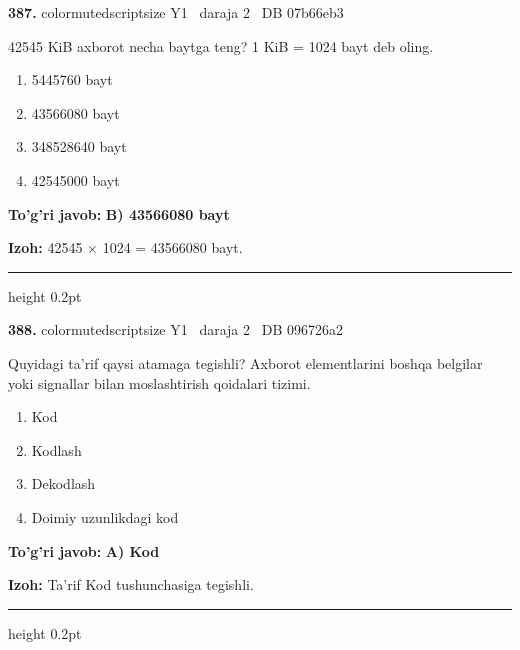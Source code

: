 \documentclass[10pt,a4paper,oneside]{article}
\begin{document}
\noindent\textbf{\color{ink}387.}  {color{muted}scriptsize Y1 \textbullet\ daraja 2 \textbullet\ DB 07b66eb3}
\par
42545 KiB axborot necha baytga teng? 1 KiB = 1024 bayt deb oling.
\begin{enumerate}[label=\Alph*),leftmargin=9mm]
\item 5445760 bayt
\item 43566080 bayt
\item 348528640 bayt
\item 42545000 bayt
\end{enumerate}
\begin{tcolorbox}[enhanced,breakable,colback=teal!4,colframe=teal!50!black,boxrule=0.5pt,arc=1.1mm,left=3mm,right=3mm,top=1.7mm,bottom=1.7mm,before skip=2mm,after skip=2mm]
\textbf{\color{teal}To'g'ri javob:} \textbf{B) 43566080 bayt}
\par\smallskip
\textbf{Izoh:} 42545 \ensuremath{\times} 1024 = 43566080 bayt.
\end{tcolorbox}
\vspace{2mm}\hrule height 0.2pt \vspace{3mm}

\noindent\textbf{\color{ink}388.}  {color{muted}scriptsize Y1 \textbullet\ daraja 2 \textbullet\ DB 096726a2}
\par
Quyidagi ta'rif qaysi atamaga tegishli? Axborot elementlarini boshqa belgilar yoki signallar bilan moslashtirish qoidalari tizimi.
\begin{enumerate}[label=\Alph*),leftmargin=9mm]
\item Kod
\item Kodlash
\item Dekodlash
\item Doimiy uzunlikdagi kod
\end{enumerate}
\begin{tcolorbox}[enhanced,breakable,colback=teal!4,colframe=teal!50!black,boxrule=0.5pt,arc=1.1mm,left=3mm,right=3mm,top=1.7mm,bottom=1.7mm,before skip=2mm,after skip=2mm]
\textbf{\color{teal}To'g'ri javob:} \textbf{A) Kod}
\par\smallskip
\textbf{Izoh:} Ta'rif Kod tushunchasiga tegishli.
\end{tcolorbox}
\vspace{2mm}\hrule height 0.2pt \vspace{3mm}
\end{document}
